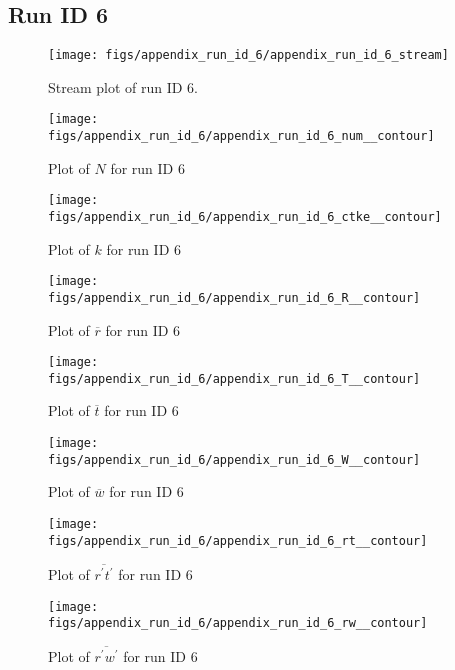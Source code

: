 \subsection{Run ID 6}
\begin{figure}[H]
\centering
\texttt{[image: figs/appendix\_run\_id\_6/appendix\_run\_id\_6\_stream]}
\caption{Stream plot of run ID 6.}
\label{fig:appendix_run_id_6_stream}
\end{figure}


\begin{figure}[H]
\centering
\texttt{[image: figs/appendix\_run\_id\_6/appendix\_run\_id\_6\_num\_\_contour]}
\caption{Plot of $N$ for run ID 6}
\label{fig:appendix_run_id_6_num__contour}
\end{figure}


\begin{figure}[H]
\centering
\texttt{[image: figs/appendix\_run\_id\_6/appendix\_run\_id\_6\_ctke\_\_contour]}
\caption{Plot of $k$ for run ID 6}
\label{fig:appendix_run_id_6_ctke__contour}
\end{figure}


\begin{figure}[H]
\centering
\texttt{[image: figs/appendix\_run\_id\_6/appendix\_run\_id\_6\_R\_\_contour]}
\caption{Plot of $\overline{r}$ for run ID 6}
\label{fig:appendix_run_id_6_R__contour}
\end{figure}


\begin{figure}[H]
\centering
\texttt{[image: figs/appendix\_run\_id\_6/appendix\_run\_id\_6\_T\_\_contour]}
\caption{Plot of $\overline{t}$ for run ID 6}
\label{fig:appendix_run_id_6_T__contour}
\end{figure}


\begin{figure}[H]
\centering
\texttt{[image: figs/appendix\_run\_id\_6/appendix\_run\_id\_6\_W\_\_contour]}
\caption{Plot of $\overline{w}$ for run ID 6}
\label{fig:appendix_run_id_6_W__contour}
\end{figure}


\begin{figure}[H]
\centering
\texttt{[image: figs/appendix\_run\_id\_6/appendix\_run\_id\_6\_rt\_\_contour]}
\caption{Plot of $\overline{r^\prime t^\prime}$ for run ID 6}
\label{fig:appendix_run_id_6_rt__contour}
\end{figure}


\begin{figure}[H]
\centering
\texttt{[image: figs/appendix\_run\_id\_6/appendix\_run\_id\_6\_rw\_\_contour]}
\caption{Plot of $\overline{r^\prime w^\prime}$ for run ID 6}
\label{fig:appendix_run_id_6_rw__contour}
\end{figure}


